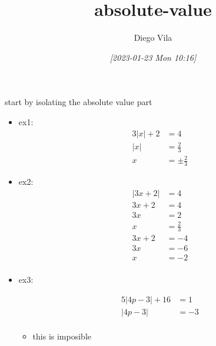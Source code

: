 \documentclass[11pt]{article}
\author{Diego Vila}
\date{\textit{[2023-01-23 Mon 10:16]}}
\title{absolute-value}
\begin{document}
\maketitle
\tableofcontents

start by isolating the absolute value part

\begin{itemize}
\item ex1:
\begin{align*}
3|x| + 2 &= 4\\
|x| &= \frac{2}{3}\\
x &= \pm \frac{2}{3}
\end{align*}

\item ex2:
\begin{align*}
|3x + 2| &= 4\\
3x + 2 &= 4\\
3x &= 2\\
x &= \frac{2}{3}\\
3x + 2 &= -4\\
3x &= -6\\
x &= -2\\
\end{align*}

\item ex3:

\begin{align*}
5|4p - 3| + 16 &= 1\\
|4p - 3| &= -3\\
\end{align*}

\begin{itemize}
\item this is imposible
\end{itemize}
\end{itemize}
\end{document}
